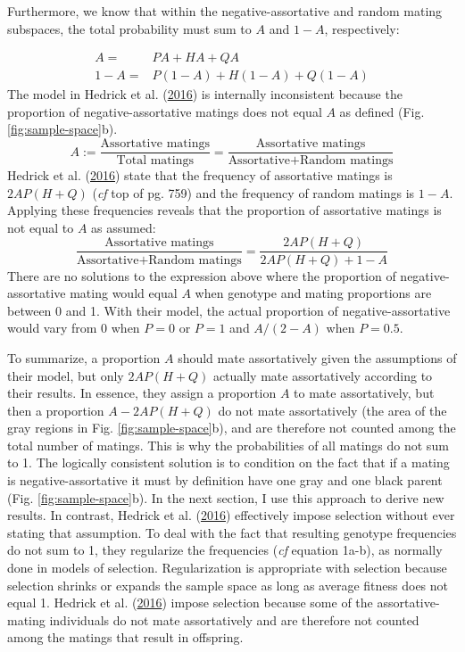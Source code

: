 \documentclass[
]{article}
\begin{document}
Furthermore, we know that within the negative-assortative and random mating subspaces, the total probability must sum to \(A\) and \(1 - A\), respectively:

\begin{align*}
  A = & PA + HA + QA \\
  1 - A = & P (1 - A) + H (1 - A) + Q (1 - A)
\end{align*}
The model in Hedrick et al. (\protect\hyperlink{ref-hedrick_negative-assortative_2016}{2016}) is internally inconsistent because the proportion of negative-assortative matings does not equal \(A\) as defined (Fig. \ref{fig:sample-space}b).
\[A := \frac{\textrm{Assortative matings}}{\textrm{Total matings}} =\frac{\textrm{Assortative matings}}{\textrm{Assortative} + \textrm{Random matings}}\]
Hedrick et al. (\protect\hyperlink{ref-hedrick_negative-assortative_2016}{2016}) state that the frequency of assortative matings is \(2 A P (H + Q)\) (\emph{cf} top of pg. 759) and the frequency of random matings is \(1 - A\). Applying these frequencies reveals that the proportion of assortative matings is not equal to \(A\) as assumed:
\[ \frac{\textrm{Assortative matings}}{\textrm{Assortative} + \textrm{Random matings}} = \frac{2 A P (H + Q)}{2 A P (H + Q) + 1 - A}\]
There are no solutions to the expression above where the proportion of negative-assortative mating would equal \(A\) when genotype and mating proportions are between 0 and 1. With their model, the actual proportion of negative-assortative would vary from 0 when \(P = 0\) or \(P = 1\) and \(A / (2 - A)\) when \(P = 0.5\).

To summarize, a proportion \(A\) should mate assortatively given the assumptions of their model, but only \(2 AP(H+Q)\) actually mate assortatively according to their results. In essence, they assign a proportion \(A\) to mate assortatively, but then a proportion \(A - 2 AP(H+Q)\) do not mate assortatively (the area of the gray regions in Fig. \ref{fig:sample-space}b), and are therefore not counted among the total number of matings. This is why the probabilities of all matings do not sum to 1. The logically consistent solution is to condition on the fact that if a mating is negative-assortative it must by definition have one gray and one black parent (Fig. \ref{fig:sample-space}b). In the next section, I use this approach to derive new results. In contrast, Hedrick et al. (\protect\hyperlink{ref-hedrick_negative-assortative_2016}{2016}) effectively impose selection without ever stating that assumption. To deal with the fact that resulting genotype frequencies do not sum to 1, they regularize the frequencies (\emph{cf} equation 1a-b), as normally done in models of selection. Regularization is appropriate with selection because selection shrinks or expands the sample space as long as average fitness does not equal 1. Hedrick et al. (\protect\hyperlink{ref-hedrick_negative-assortative_2016}{2016}) impose selection because some of the assortative-mating individuals do not mate assortatively and are therefore not counted among the matings that result in offspring.
\end{document}
